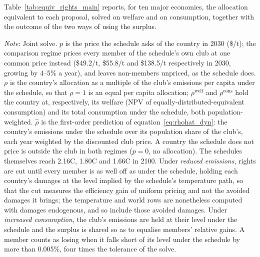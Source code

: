 \documentclass[12pt,english]{article}
\theoremstyle{remark}
\begin{document}
Table~\ref{tab:equiv_rights_main} reports, for ten major economies, the allocation equivalent to each proposal, solved on welfare and on consumption, together with the outcome of the two ways of using the surplus.

\begin{table}[!ht]
\centering
\small
\singlespacing
\caption{Allocations equivalent to three differentiated-price schedules, and the dividend of a uniform price}
\label{tab:equiv_rights_main}
\begin{minipage}{\textwidth}\footnotesize\singlespacing
\emph{Note}: Joint solve. $p$ is the price the schedule asks of the country in 2030 (\$/t); the comparison regime prices every member of the schedule's own club at one common price instead (\$49.2/t, \$55.8/t and \$138.5/t respectively in 2030, growing by 4--5\% a year), and leaves non-members unpriced, as the schedule does. $\rho$ is the country's allocation as a multiple of the club's emissions per capita under the schedule, so that $\rho=1$ is an equal per capita allocation; $\rho^{\mathrm{welf}}$ and $\rho^{\mathrm{cons}}$ hold the country at, respectively, its welfare (NPV of equally-distributed-equivalent consumption) and its total consumption under the schedule, both population-weighted. $\hat\rho$ is the first-order prediction of equation~\eqref{eq:rhohat_dyn}: the country's emissions under the schedule over its population share of the club's, each year weighted by the discounted club price. A country the schedule does not price is outside the club in both regimes ($p=0$, no allocation). The schedules themselves reach 2.16\textdegree C, 1.80\textdegree C and 1.66\textdegree C in 2100. Under \emph{reduced emissions}, rights are cut until every member is as well off as under the schedule, holding each country's damages at the level implied by the schedule's temperature path, so that the cut measures the efficiency gain of uniform pricing and not the avoided damages it brings; the temperature and world rows are nonetheless computed with damages endogenous, and so include those avoided damages. Under \emph{increased consumption}, the club's emissions are held at their level under the schedule and the surplus is shared so as to equalise members' relative gains. A member counts as losing when it falls short of its level under the schedule by more than 0.005\%, four times the tolerance of the solve.
\end{minipage}
\end{table}
\end{document}
